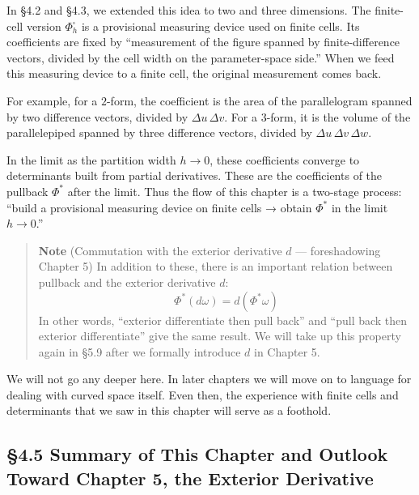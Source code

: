 \documentclass[a4paper,12pt,openany]{book}
\begin{document}
In §4.2 and §4.3, we extended this idea to two and three dimensions. The
finite-cell version \(\Phi_h^\square\) is a provisional measuring device
used on finite cells. Its coefficients are fixed by ``measurement of the
figure spanned by finite-difference vectors, divided by the cell width
on the parameter-space side.'' When we feed this measuring device to a
finite cell, the original measurement comes back.

For example, for a \(2\)-form, the coefficient is the area of the
parallelogram spanned by two difference vectors, divided by
\(\Delta u\,\Delta v\). For a \(3\)-form, it is the volume of the
parallelepiped spanned by three difference vectors, divided by
\(\Delta u\,\Delta v\,\Delta w\).

In the limit as the partition width \(h\to0\), these coefficients
converge to determinants built from partial derivatives. These are the
coefficients of the pullback \(\Phi^*\) after the limit. Thus the flow
of this chapter is a two-stage process: ``build a provisional measuring
device on finite cells → obtain \(\Phi^*\) in the limit \(h\to0\).''

\begin{quote}
\textbf{Note} (Commutation with the exterior derivative \(d\) —
foreshadowing Chapter 5) In addition to these, there is an important
relation between pullback and the exterior derivative \(d\):
\[\Phi^*(d\omega) = d(\Phi^*\omega)\] In other words, ``exterior
differentiate then pull back'' and ``pull back then exterior
differentiate'' give the same result. We will take up this property
again in §5.9 after we formally introduce \(d\) in Chapter 5.
\end{quote}

We will not go any deeper here. In later chapters we will move on to
language for dealing with curved space itself. Even then, the experience
with finite cells and determinants that we saw in this chapter will
serve as a foothold.

\par\vspace{0.35em}\par

\hypertarget{summary-of-this-chapter-and-outlook-toward-chapter-5-the-exterior-derivative}{%
\subsection{§4.5 Summary of This Chapter and Outlook Toward Chapter 5,
the Exterior
Derivative}\label{summary-of-this-chapter-and-outlook-toward-chapter-5-the-exterior-derivative}}
\end{document}
